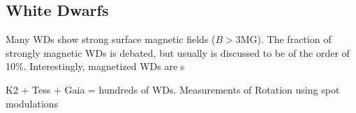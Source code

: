 {\color{red} \subsection{White Dwarfs}}
Many WDs show strong surface magnetic fields ($B>$3MG). The fraction of strongly magnetic WDs is debated, but usually is discussed to be of the order of 10\%. Interestingly, magnetized WDs are s 

K2 + Tess + Gaia = hundreds of WDs. Measurements of Rotation using spot modulations
